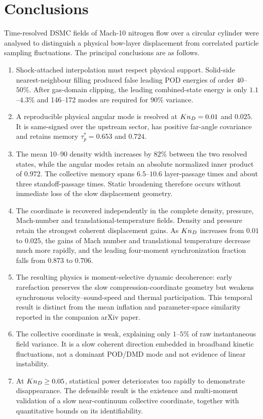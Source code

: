 \section{Conclusions}
Time-resolved DSMC fields of Mach-10 nitrogen flow over a circular cylinder were analysed to distinguish a physical bow-layer displacement from correlated particle sampling fluctuations. The principal conclusions are as follows.
\begin{enumerate}[leftmargin=1.6em]
\item Shock-attached interpolation must respect physical support. Solid-side nearest-neighbour filling produced false leading POD energies of order $40$--$50\%$. After gas-domain clipping, the leading combined-state energy is only $1.1$--$4.3\%$ and 146--172 modes are required for $90\%$ variance.
\item A reproducible physical angular mode is resolved at $Kn_D=0.01$ and $0.025$. It is same-signed over the upstream sector, has positive far-angle covariance and retains memory $\tau_p^*=0.653$ and $0.724$.
\item The mean 10--90 density width increases by $82\%$ between the two resolved states, while the angular modes retain an absolute normalized inner product of $0.972$. The collective memory spans $6.5$--$10.6$ layer-passage times and about three standoff-passage times. Static broadening therefore occurs without immediate loss of the slow displacement geometry.
\item The coordinate is recovered independently in the complete density, pressure, Mach-number and translational-temperature fields. Density and pressure retain the strongest coherent displacement gains. As $Kn_D$ increases from $0.01$ to $0.025$, the gains of Mach number and translational temperature decrease much more rapidly, and the leading four-moment synchronization fraction falls from $0.873$ to $0.706$.
\item The resulting physics is moment-selective dynamic decoherence: early rarefaction preserves the slow compression-coordinate geometry but weakens synchronous velocity--sound-speed and thermal participation. This temporal result is distinct from the mean inflation and parameter-space similarity reported in the companion arXiv paper.
\item The collective coordinate is weak, explaining only $1$--$5\%$ of raw instantaneous field variance. It is a slow coherent direction embedded in broadband kinetic fluctuations, not a dominant POD/DMD mode and not evidence of linear instability.
\item At $Kn_D\geq0.05$, statistical power deteriorates too rapidly to demonstrate disappearance. The defensible result is the existence and multi-moment validation of a slow near-continuum collective coordinate, together with quantitative bounds on its identifiability.
\end{enumerate}
